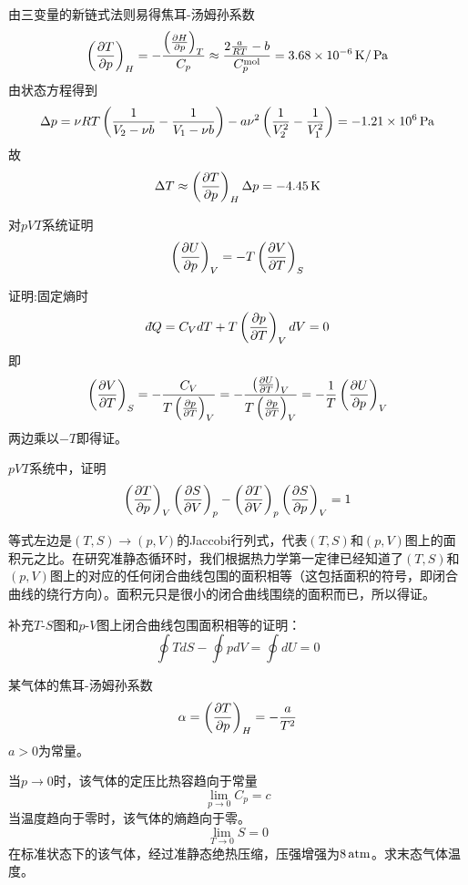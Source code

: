\documentclass[CJK]{beamer}
\begin{document}
\begin{frame}
  \bch
  {\small
  由三变量的新链式法则易得焦耳-汤姆孙系数
        $$\left(\frac{\partial T}{\partial p}\right)_{H} = -\frac{\left(\frac{\partial H}{\partial p}\right)_{T}}{C_p} \approx \frac{2\frac{a}{RT}-b}{C_p^{\rm mol}} =  3.68\times 10^{-6}\,\mathrm{K}/\,\mathrm{Pa}$$
        由状态方程得到
        $$\Delta p = \nu RT\left(\frac{1}{V_2-\nu b}-\frac{1}{V_1-\nu b}\right) -a\nu^2\left(\frac{1}{V_2^2}-\frac{1}{V_1^2}\right)= -1.21\times 10^6\,\mathrm{Pa}$$
        故
        $$\Delta T \approx \left(\frac{\partial T}{\partial p}\right)_{H} \Delta p = -4.45\,\mathrm{K}$$
  }
  \ech
\end{frame}


\begin{frame}
  \chtitle{\proid  (\sthree)}
  \bch
  对$pVT$系统证明
  $$\left(\frac{\partial U}{\partial p}\right)_{V} = -T\left(\frac{\partial V}{\partial T}\right)_{S}$$
  \ech
\end{frame}


\begin{frame}
  \bch
  证明:固定熵时
  $$ \dbar Q = C_V dT + T \pfrac pTV dV = 0 $$
  即
  $$ \left(\frac{\partial V}{\partial T}\right)_{S} = -\frac{C_V}{T\left(\frac{\partial p}{\partial T}\right)_{V}} = -\frac{\left(\frac{\partial U}{\partial T}\right)_{V}}{T\left(\frac{\partial p}{\partial T}\right)_{V}} = -\frac{1}{T} \left(\frac{\partial U}{\partial p}\right)_{V} $$
  两边乘以$-T$即得证。
  \ech
\end{frame}

\begin{frame}
  \chtitle{\proid (\sthree)}
  \bch
  $pVT$系统中，证明
  $$ \left(\frac{\partial T}{\partial p}\right)_{V} \left(\frac{\partial S}{\partial V}\right)_{p} - \left(\frac{\partial T}{\partial V}\right)_{p} \left(\frac{\partial S}{\partial p}\right)_{V} = 1 $$
  \ech
\end{frame}

\begin{frame}
  \bch
  等式左边是$(T,S)\rightarrow (p, V)$的Jaccobi行列式，代表$(T,S)$和$(p,V)$图上的面积元之比。在研究准静态循环时，我们根据热力学第一定律已经知道了$(T,S)$和$(p,V)$图上的对应的任何闭合曲线包围的面积相等（这包括面积的符号，即闭合曲线的绕行方向）。面积元只是很小的闭合曲线围绕的面积而已，所以得证。

  \skipline

  补充$T$-$S$图和$p$-$V$图上闭合曲线包围面积相等的证明：
$$ \oint TdS - \oint pdV = \oint dU = 0$$
  
  \ech
\end{frame}


\begin{frame}
  \chtitle{\proid (\sfour)}
  \bch
  {\small
  某气体的焦耳-汤姆孙系数
  $$\alpha = \left(\frac{\partial T}{\partial p}\right)_{H} =-\frac{a}{T^2}$$
  $a>0$为常量。

  当$p\rightarrow 0$时，该气体的定压比热容趋向于常量
  $$\lim_{p\rightarrow 0}C_p = c$$
  当温度趋向于零时，该气体的熵趋向于零。
  $$ \lim_{T\rightarrow 0} S = 0$$
  在标准状态下的该气体，经过准静态绝热压缩，压强增强为$8\,\mathrm{atm}$。求末态气体温度。
  }
  \ech
\end{frame}
\end{document}
